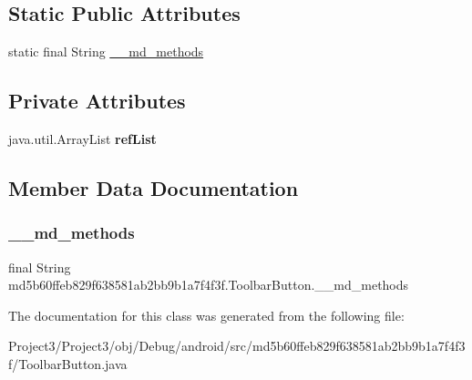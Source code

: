 \subsection*{Static Public Attributes}
\begin{DoxyCompactItemize}
\item 
static final String \hyperlink{classmd5b60ffeb829f638581ab2bb9b1a7f4f3f_1_1ToolbarButton_a4b908a9906061cf63121c61f707eb1da}{\+\_\+\+\_\+md\+\_\+methods}
\end{DoxyCompactItemize}
\subsection*{Private Attributes}
\begin{DoxyCompactItemize}
\item 
\mbox{\label{classmd5b60ffeb829f638581ab2bb9b1a7f4f3f_1_1ToolbarButton_afa96144f45d698d61368958ea346709a}} 
java.\+util.\+Array\+List {\bfseries ref\+List}
\end{DoxyCompactItemize}


\subsection{Member Data Documentation}
\mbox{\label{classmd5b60ffeb829f638581ab2bb9b1a7f4f3f_1_1ToolbarButton_a4b908a9906061cf63121c61f707eb1da}} 
\subsubsection{\texorpdfstring{\+\_\+\+\_\+md\+\_\+methods}{\_\_md\_methods}}
{\footnotesize\ttfamily final String md5b60ffeb829f638581ab2bb9b1a7f4f3f.\+Toolbar\+Button.\+\_\+\+\_\+md\+\_\+methods\hspace{0.3cm}{\ttfamily [static]}}



The documentation for this class was generated from the following file\+:\begin{DoxyCompactItemize}
\item 
Project3/\+Project3/obj/\+Debug/android/src/md5b60ffeb829f638581ab2bb9b1a7f4f3f/Toolbar\+Button.\+java\end{DoxyCompactItemize}
